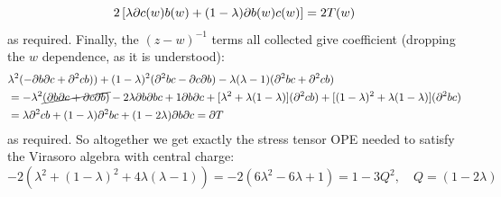 \documentclass[11pt]{article}
\begin{document}
\begin{enumerate}
	\[
		2 \left[ \lambda \partial c(w) b(w) + (1 - \lambda) \partial b(w) c(w) \right] = 2 T(w)
	\]
	as required. Finally, the $(z-w)^{-1}$ terms all collected give coefficient (dropping the $w$ dependence, as it is understood):
	\[
	\begin{aligned}
		& \lambda^2 (-\partial b \partial c + \partial^2 c b)) + (1-\lambda)^2 (\partial^2 b c - \partial c \partial b) - \lambda (\lambda - 1) (\partial^2 b c + \partial^2 c b)\\
		&= - \lambda^2 \cancel{(\partial b \partial c + \partial c \partial b)} - 2 \lambda \partial b \partial bc + 1 \partial b \partial c  + [\lambda^2 + \lambda (1 -\lambda)] (\partial^2 c b) + [(1-\lambda)^2 + \lambda (1-\lambda)] (\partial^2 b c)\\
		&= \lambda \partial^2 c b + (1-\lambda) \partial^2 b c + (1 - 2 \lambda) \partial b \partial c = \partial T
	\end{aligned}
	\]
	as required. So altogether we get exactly the stress tensor OPE needed to satisfy the Virasoro algebra with central charge:
	\[
		-2 (\lambda^2 + (1-\lambda)^2 + 4 \lambda(\lambda-1)) = - 2 (6 \lambda^2 - 6 \lambda + 1) = 1 - 3 Q^2, \quad Q = (1-2\lambda)
	\]
	

\end{enumerate}
\end{document}

